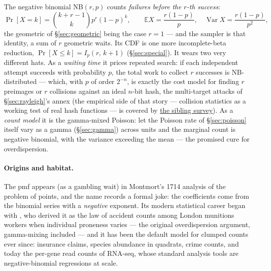 \documentclass[11pt]{article}
\numberwithin{equation}{section}
\newcommand{\sisterurl}{https://sanya-shopper.github.io/randtests/}
\newcommand{\E}{\mathbb{E}}
\newcommand{\Var}{\operatorname{Var}}
\begin{document}
The negative binomial NB$(r,p)$ counts \emph{failures before the $r$-th
success}:
\[
\Pr[X=k]=\binom{k+r-1}{k}p^r(1-p)^k,\qquad
\E X = \frac{r(1-p)}{p},\quad \Var X = \frac{r(1-p)}{p^2},
\]
the geometric of \S\ref{sec:geometric} being the case $r=1$ --- and the
sampler is that identity, a sum of $r$ geometric waits.  Its CDF is one
more incomplete-beta reduction, $\Pr[X\le k]=I_p(r,\,k{+}1)$
(\S\ref{sec:special}).  It wears two very different hats.  As a
\emph{waiting time} it prices repeated search: if each independent
attempt succeeds with probability $p$, the total work to collect $r$
successes is NB-distributed --- which, with $p$ of order $2^{-n}$, is
exactly the cost model for finding $r$ preimages or $r$ collisions
against an ideal $n$-bit hash, the multi-target attacks of
\S\ref{sec:rayleigh}'s annex (the empirical side of that story ---
collision statistics as a working test of real hash functions --- is
covered by \href{\sisterurl hashing.html}{the sibling survey}).  As a \emph{count model} it is the
gamma-mixed Poisson: let the Poisson rate of \S\ref{sec:poisson} itself
vary as a gamma (\S\ref{sec:gamma}) across units and the marginal count
is negative binomial, with the variance exceeding the mean --- the
promised cure for overdispersion.

\paragraph{Origins and habitat.}
The pmf appears (as a gambling wait) in Montmort's 1714 analysis of the
problem of points, and the name records a formal joke: the coefficients
come from the binomial series with a \emph{negative} exponent.  Its
modern statistical career began with \citet{greenwood1920}, who derived
it as the law of accident counts among London munitions workers when
individual proneness varies --- the original overdispersion argument,
gamma-mixing included --- and it has been the default model for clumped
counts ever since: insurance claims, species abundance in quadrats,
crime counts, and today the per-gene read counts of RNA-seq, whose
standard analysis tools are negative-binomial regressions at scale.
\end{document}
